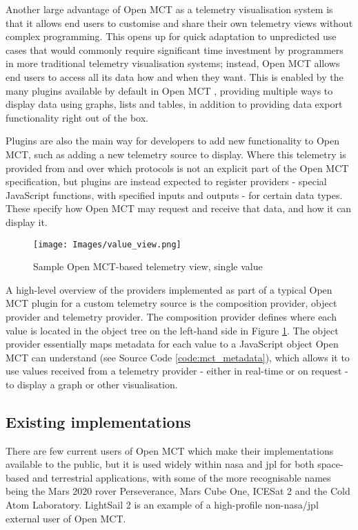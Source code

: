 Another large advantage of Open MCT as a telemetry visualisation system is that it allows end users to customise and share their own telemetry views without complex programming. This opens up for quick adaptation to unpredicted use cases that would commonly require significant time investment by programmers in more traditional telemetry visualisation systems; instead, Open MCT allows end users to access all its data how and when they want. This is enabled by the many plugins available by default in Open MCT \cite{mctplugins}, providing multiple ways to display data using graphs, lists and tables, in addition to providing data export functionality right out of the box. \cite{omct_intro}

Plugins are also the main way for developers to add new functionality to Open MCT, such as adding a new telemetry source to display. Where this telemetry is provided from and over which protocols is not an explicit part of the Open MCT specification, but plugins are instead expected to register providers - special JavaScript functions, with specified inputs and outputs - for certain data types. These specify how Open MCT may request and receive that data, and how it can display it.

\begin{figure}[ht]
    \centering
    \texttt{[image: Images/value\_view.png]}
    \caption{Sample Open MCT-based telemetry view, single value}
    \label{fig:omctvalue}
\end{figure}

A high-level overview of the providers implemented as part of a typical Open MCT plugin for a custom telemetry source is the composition provider, object provider and telemetry provider. The composition provider defines where each value is located in the object tree on the left-hand side in Figure \ref{fig:omctvalue}. The object provider essentially maps metadata for each value to a JavaScript object Open MCT can understand (see Source Code \ref{code:mct_metadata}), which allows it to use values received from a telemetry provider - either in real-time or on request - to display a graph or other visualisation.


\subsection{Existing implementations}
There are few current users of Open MCT which make their implementations available to the public, but it is used widely within \acrshort{nasa} and \acrshort{jpl} for both space-based and terrestrial applications, with some of the more recognisable names being the Mars 2020 rover Perseverance, Mars Cube One, ICESat 2 and the Cold Atom Laboratory. LightSail 2 is an example of a high-profile non-\acrshort{nasa}/\acrshort{jpl} external user of Open MCT. \cite{omct_users}

